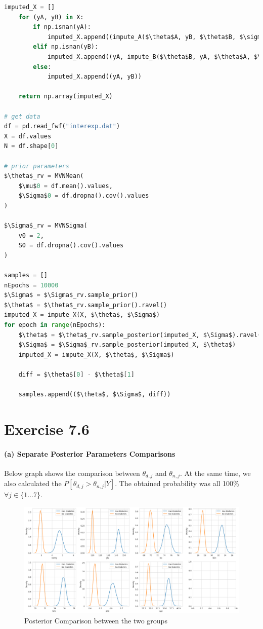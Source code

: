 \documentclass[11pt, letterpaper]{article}
\begin{document}
\begin{lstlisting}[language=Python]
    imputed_X = []
    for (yA, yB) in X:
        if np.isnan(yA):
            imputed_X.append((impute_A($\theta$A, yB, $\theta$B, $\sigma$2A, $\sigma$2B, $\rho$), yB))
        elif np.isnan(yB):
            imputed_X.append((yA, impute_B($\theta$B, yA, $\theta$A, $\sigma$2B, $\sigma$2A, $\rho$)))
        else:
            imputed_X.append((yA, yB))

    return np.array(imputed_X)

# get data
df = pd.read_fwf("interexp.dat")
X = df.values
N = df.shape[0]

# prior parameters
$\theta$_rv = MVNMean(
    $\mu$0 = df.mean().values,
    $\Sigma$0 = df.dropna().cov().values
)

$\Sigma$_rv = MVNSigma(
    v0 = 2,
    S0 = df.dropna().cov().values
)

samples = []
nEpochs = 10000
$\Sigma$ = $\Sigma$_rv.sample_prior()
$\theta$ = $\theta$_rv.sample_prior().ravel()
imputed_X = impute_X(X, $\theta$, $\Sigma$)
for epoch in range(nEpochs):
    $\theta$ = $\theta$_rv.sample_posterior(imputed_X, $\Sigma$).ravel()
    $\Sigma$ = $\Sigma$_rv.sample_posterior(imputed_X, $\theta$)
    imputed_X = impute_X(X, $\theta$, $\Sigma$)

    diff = $\theta$[0] - $\theta$[1]

    samples.append(($\theta$, $\Sigma$, diff))
\end{lstlisting}



\newpage
\section{Exercise 7.6}
\paragraph{(a) Separate Posterior Parameters Comparisons}
Below graph shows the comparison between $\theta_{d, j}$ and $\theta_{n, j}$. At the same time, we also calculated the $P[\theta_{d, j} > \theta_{n, j}|Y]$. The obtained probability was all 100\% $\forall j \in \{1\dots7\}$.
\begin{figure}[!h]
  \centering
  \includegraphics[width=1.0\textwidth]{3.a.png}
  \captionsetup{justification=centering}
  \caption{Posterior Comparison between the two groups}
\end{figure}
\end{document}
